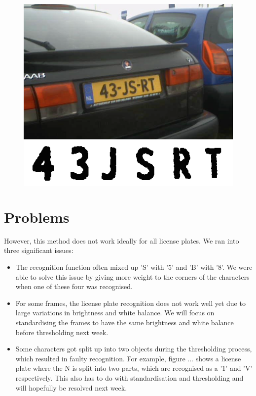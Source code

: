 \documentclass{tudelftposter}
\begin{document}
\begin{figure}[h]
	\centering
	\includegraphics[width=800pt]{goodcar.png}
\end{figure}

\section{Problems}
However, this method does not work ideally for all license plates. We ran into three significant issues:
\begin{itemize}
\item The recognition function often mixed up 'S' with '5' and 'B' with '8'. We were able to solve this issue by giving more weight to the corners of the characters when one of these four was recognised.
\item For some frames, the license plate recognition does not work well yet due to large variations in brightness and white balance. We will focus on standardising the frames to have the same brightness and white balance before thresholding next week.
\item Some characters got split up into two objects during the thresholding process, which resulted in faulty recognition. For example, figure ... shows a license plate where the N is split into two parts, which are recognised as a '1' and 'V' respectively. This also has to do with standardisation and thresholding and will hopefully be resolved next week.
\end{itemize}
\end{document}
